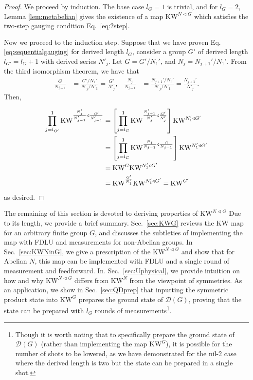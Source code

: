 \documentclass[nofootinbib,prx,twocolumn,showpacs,superscriptaddress,notitlepage,amsmath,amssymb]{revtex4-2}
\theoremstyle{definition}
\def\KW{\text{KW}}
\begin{document}
\begin{proof}
We proceed by induction. The base case $l_G=1$ is trivial, and for $l_G=2$, Lemma \ref{lem:metabelian} gives the existence of a map $\KW^{N \triangleleft G}$ which satisfies the two-step gauging condition Eq.~\eqref{eq:2step}. 

Now we proceed to the induction step. Suppose that we have proven Eq.\eqref{eq:sequentialgauging} for derived length $l_G$,  consider a group $G'$ of derived length $l_{G'} = l_{G}+1$ with derived series $N'_{j}$. 
Let $G= G'/N_{1}'$, and $N_j=N_{j+1}'/N_1'$. From the third isomorphism theorem, we have that
\begin{align}
    \frac{G}{N_{j-1}} &= \frac{G'/N_{1}'}{N'_{j}/N'_{1}} = \frac{G'}{N'_{j}}, & \frac{N_j}{N_{j-1}} &=\frac{N_{j+1}'/N_{1}'}{N'_{j}/N'_{1}} = \frac{N_{j+1}'}{N'_{j}}.
\end{align}
Then,

\begin{align}
\begin{split}
  \prod_{j=l_{G'}}^{1} \KW^{{N'_{j}\over N'_{j-1}}\triangleleft{ G'\over N'_{j-1}}} &= \left[\prod_{j=l_{G}}^{1} \KW^{{N'_{j+1}\over N'_{j}}\triangleleft{ G'\over N'_{j}}}\right] \KW^{N_1' \triangleleft G'} \\
&= \left[\prod_{j=l_{G}}^{1} \KW^{{N_{j}\over N_{j-1}}\triangleleft{ G\over N_{j-1}}}\right] \KW^{N_1' \triangleleft G'}\\
&=\KW^G \KW^{N_1' \triangleleft G'}\\
& = \KW^{\frac{G'}{N_1'}} \KW^{N_1' \triangleleft G'} =\KW^{G'}  
\end{split}
\end{align}
as desired.
\end{proof}




The remaining of this section is devoted to deriving properties of $\KW^{N \triangleleft G}$ Due to its length, we provide a brief summary. Sec.~\ref{sec:KWG} reviews the KW map for an arbitrary finite group $G$, and discusses the subtleties of implementing the map with FDLU and measurements for non-Abelian groups. In Sec.~\ref{sec:KWNinG}, we give a prescription of the $\KW^{N \triangleleft G}$ and show that for Abelian $N$, this map can be implemented with FDLU and a single round of measurement and feedforward.
In. Sec.~\ref{sec:Uphysical}, we provide intuition on how and why $\KW^{N \triangleleft G}$ differs from $\KW^{N}$ from the viewpoint of symmetries.
As an application, we show in Sec.~\ref{sec:QDprep} that inputting the symmetric product state into $\KW^G$ prepares the ground state of $\mathcal D(G)$, proving that the state can be prepared with $l_G$ rounds of measurements\footnote{Though it is worth noting that to specifically prepare the ground state of $\mathcal D(G)$ (rather than implementing the map $\KW^G$), it is possible for the number of shots to be lowered, as we have demonstrated for the nil-2 case where the derived length is two but the state can be prepared in a single shot.}.
\end{document}
